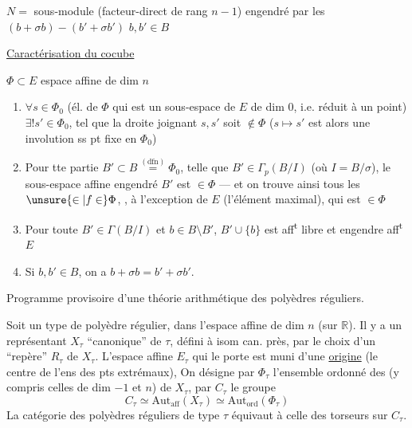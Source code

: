 $N=$ sous-module (facteur-direct de rang $n-1$) engendré par les $(b+\sigma b)-(b'+\sigma b')$ $b,b'\in B$

\uline{Caractérisation du cocube}

$\Phi\subset E$ espace affine de dim $n$

\begin{enumerate}[label=\alph*)]
\item $\forall s\in\Phi_0$ (él. de $\Phi$ qui est un sous-espace de $E$ de dim 0, i.e. réduit à un point) $\exists!s'\in\Phi_0$,  tel que la droite joignant $s,s'$ soit $\notin\Phi$ ($s\mapsto s'$ est alors une involution ss pt fixe en $\Phi_0$) 
\item Pour tte partie $B'\subset B\overset{(\mathrm{dfn})}=\Phi_0$, telle que $B'\in\Gamma_p(B/I)$ (où $I=B/\sigma$), le sous-espace  affine engendré  $B'$ est $\in\Phi$ ---  et on trouve ainsi tous les $\unsure{\in|f\in}\Phi$, , à l'exception de $E$ (l'élément maximal), qui est $\in\Phi$
\item Pour toute $B'\in\Gamma(B/I)$ et $b\in B\setminus B'$, $B'\cup\{b\}$ est aff\textsuperscript{t} libre et engendre aff\textsuperscript{t} $E$
\item Si $b,b'\in B$, on a $b+\sigma b=b'+\sigma b'$.
\end{enumerate}

Programme provisoire d'une théorie arithmétique des polyèdres réguliers.

Soit un type \inserted{$\tau$} de polyèdre régulier, dans l'espace affine de dim $n$ (sur $\mathbb R$). Il y a un représentant $X_\tau$ ``canonique'' de $\tau$, défini à isom can. près, par le choix d'un ``repère'' $R_\tau$ de $X_\tau$. L'espace affine $E_\tau$ qui le porte est muni d'une \uline{origine} (le centre de  l'ens des pts extrémaux),  On désigne par $\Phi_\tau$ l'ensemble ordonné des  (y compris celles de dim $-1$ et $n$) de $X_\tau$, par $C_\tau$ le groupe
\[
 C_\tau\simeq\mathrm{Aut}_{\mathrm{aff}}(X_\tau)\simeq\mathrm{Aut}_{\mathrm{ord}}(\Phi_\tau)
\]
La catégorie des polyèdres réguliers de type $\tau$ équivaut à celle des torseurs sur $C_\tau$.

